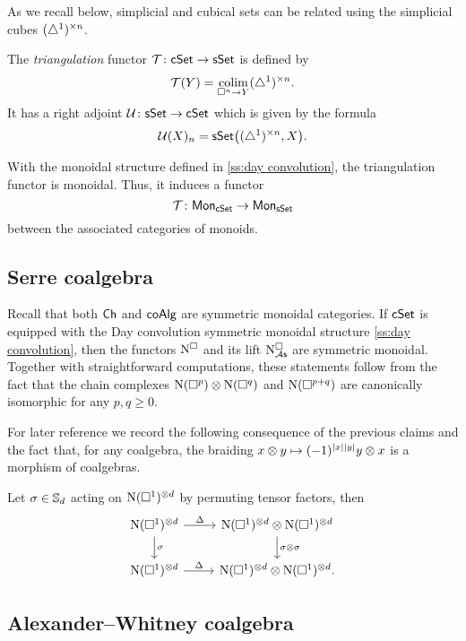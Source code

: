 As we recall below, simplicial and cubical sets can be related using the simplicial cubes $(\simplex^1)^{\times n}$.

The \textit{triangulation} functor $\mathcal{T} \colon \cSet \to \sSet$ is defined by
\[
\mathcal{T}(Y) = \colim_{\cube^n \to Y} (\simplex^1)^{\times n}.
\]
It has a right adjoint $\mathcal{U} \colon \sSet \to \cSet$ which is given by the formula
\[
\mathcal{U}(X)_n = \sSet \big( (\simplex^1)^{\times n}, X \big).
\]

With the monoidal structure defined in \cref{ss:day convolution}, the triangulation functor is monoidal.
Thus, it induces a functor
\[
\mathcal{T} \colon \Mon_{\cSet} \to \Mon_{\sSet}
\]
between the associated categories of monoids.

\subsection{Serre coalgebra} \label{ss:serre coalgebra sym monoidal}

Recall that both $\Ch$ and $\coAlg$ are symmetric monoidal categories.
If $\cSet$ is equipped with the Day convolution symmetric monoidal structure \cref{ss:day convolution}, then the functors $\cchains$ and its lift $\cchainsAS$ are symmetric monoidal.
Together with straightforward computations, these statements follow from the fact that the chain complexes $\chains(\cube^p) \otimes \chains(\cube^q)$ and $\chains(\cube^{p+q})$ are canonically isomorphic for any $p, q \geq 0$.

For later reference we record the following consequence of the previous claims and the fact that, for any coalgebra, the braiding $x \otimes y \mapsto (-1)^{\bars{x} \bars{y}} y \otimes x$ is a morphism of coalgebras.

\begin{lemma} \label{l:serre diagonal invariant}
	Let $\sigma \in \S_d$ acting on $\chains(\cube^1)^{\otimes d}$ by permuting tensor factors, then
	\[
	\begin{tikzcd}
	\chains(\cube^1)^{\otimes d} \arrow[r, "\Delta"] \arrow[d, "\sigma"] &
	\chains(\cube^1)^{\otimes d} \otimes \chains(\cube^1)^{\otimes d} \arrow[d, "\sigma \otimes \sigma"] \\
	\chains(\cube^1)^{\otimes d} \arrow[r, "\Delta"] &
	\chains(\cube^1)^{\otimes d} \otimes \chains(\cube^1)^{\otimes d}.
	\end{tikzcd}
	\]
\end{lemma}

\subsection{Alexander--Whitney coalgebra}


